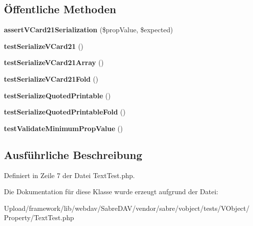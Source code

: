 \subsection*{Öffentliche Methoden}
\begin{DoxyCompactItemize}
\item 
\mbox{\label{class_sabre_1_1_v_object_1_1_property_1_1_text_test_ac25b75b41c3aa8479b87e4523814e541}} 
{\bfseries assert\+V\+Card21\+Serialization} (\$prop\+Value, \$expected)
\item 
\mbox{\label{class_sabre_1_1_v_object_1_1_property_1_1_text_test_aae60d7fe72d6d333bf836a921e640c84}} 
{\bfseries test\+Serialize\+V\+Card21} ()
\item 
\mbox{\label{class_sabre_1_1_v_object_1_1_property_1_1_text_test_a2adacae93bbbeca8060b1af8c2f58dae}} 
{\bfseries test\+Serialize\+V\+Card21\+Array} ()
\item 
\mbox{\label{class_sabre_1_1_v_object_1_1_property_1_1_text_test_a468e8bb0aa12b4aa8a6059b5e0717e41}} 
{\bfseries test\+Serialize\+V\+Card21\+Fold} ()
\item 
\mbox{\label{class_sabre_1_1_v_object_1_1_property_1_1_text_test_a0045d9ae3c8b57bc016dd5a1c0af79c1}} 
{\bfseries test\+Serialize\+Quoted\+Printable} ()
\item 
\mbox{\label{class_sabre_1_1_v_object_1_1_property_1_1_text_test_a5e3b5a3581d0b7fdee8720e6da5ca721}} 
{\bfseries test\+Serialize\+Quoted\+Printable\+Fold} ()
\item 
\mbox{\label{class_sabre_1_1_v_object_1_1_property_1_1_text_test_a3a467cf336fc0d49a76cb2f631390968}} 
{\bfseries test\+Validate\+Minimum\+Prop\+Value} ()
\end{DoxyCompactItemize}


\subsection{Ausführliche Beschreibung}


Definiert in Zeile 7 der Datei Text\+Test.\+php.



Die Dokumentation für diese Klasse wurde erzeugt aufgrund der Datei\+:\begin{DoxyCompactItemize}
\item 
Upload/framework/lib/webdav/\+Sabre\+D\+A\+V/vendor/sabre/vobject/tests/\+V\+Object/\+Property/Text\+Test.\+php\end{DoxyCompactItemize}
